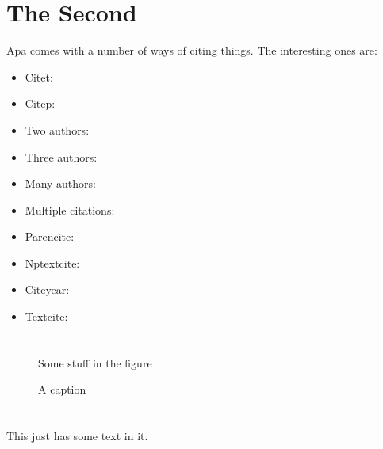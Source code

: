 \documentclass[draft]{dragonfly-report}
\begin{document}
\section{The Second}
Apa comes with a number of ways of citing things.
The interesting ones are:

\begin{itemize}
  \item Citet: \citet{baker_nzclassification_2010}
  \item Citep: \citep{doc_sealion_2009}
  \item Two authors: \citep{abraham_summary_98-09}
  \item Three authors: \citep{thompson_dolphin_2013}
  \item Many authors: \citep{baker_global_2007}
  \item Multiple citations: \citep{baker_global_2007, abraham_summary_98-09, thompson_dolphin_2013} 
  \item Parencite: \parencite{gales_phocarctos_2008}
  \item Nptextcite: 
  \item Citeyear: \citeyear{robertson_population_2011}
  \item Textcite: \textcite{roe_necropsy_2007}
\end{itemize}

\clearpage

\printbibliography


\clearpage
\appendices


\section{}
\begin{figure}
  Some stuff in the figure
  \caption{A caption}
\end{figure}

\section{}

This just has some text in it.
\end{document}
